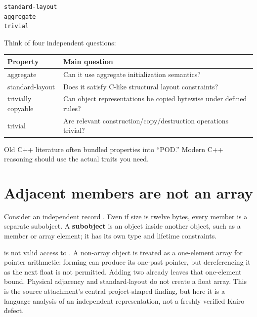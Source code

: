 \begin{verbatim}
standard-layout
aggregate
trivial
\end{verbatim}

Think of four independent questions:

{\def\LTcaptype{none} %
\begin{longtable}[]{@{}
  >{\raggedright\arraybackslash}p{}
  >{\raggedright\arraybackslash}p{}@{}}
\toprule\noalign{}
\begin{minipage}[b]{\linewidth}\raggedright
Property
\end{minipage} & \begin{minipage}[b]{\linewidth}\raggedright
Main question
\end{minipage} \\
\midrule\noalign{}
\endhead
\bottomrule\noalign{}
\endlastfoot
aggregate & Can it use aggregate initialization semantics? \\
standard-layout & Does it satisfy C-like structural layout constraints? \\
trivially copyable & Can object representations be copied bytewise under defined rules? \\
trivial & Are relevant construction/copy/destruction operations trivial? \\
\end{longtable}
}

Old C++ literature often bundled properties into ``POD.'' Modern C++ reasoning should use the actual traits you need.

\section{Adjacent members are not an array}\label{05-engine-i-ch003-adjacent-members-are-not-an-array}

\hypertarget{05-engine-i-ch003-adjacent-members-are-not-an-array}{}

Consider an independent record . Even if size is twelve bytes, every member is a separate subobject. A \textbf{subobject} is an object inside another object, such as a member or array element; it has its own type and lifetime constraints.

 is not valid access to . A non-array object is treated as a one-element array for pointer arithmetic: forming  can produce its one-past pointer, but dereferencing it as the next float is not permitted. Adding two already leaves that one-element bound. Physical adjacency and standard-layout do not create a float array. This is the source attachment's central project-shaped finding, but here it is a language analysis of an independent representation, not a freshly verified Kairo defect.

